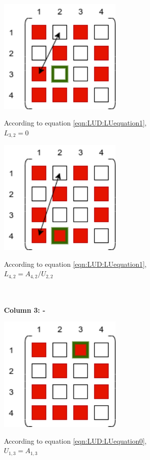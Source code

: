 \begin{minipage}{0.45\textwidth}
\includegraphics[width=0.45\textwidth]{./Scheduler/PpT-Symbolic_A12.png}
\end{minipage}%
\hfill
\begin{minipage}{0.85\textwidth}
According to equation \ref{eqn:LUD:LUequation1},\\
$L_{3,2}=0$
\end{minipage}

\begin{minipage}{0.45\textwidth}
\includegraphics[width=0.45\textwidth]{./Scheduler/PpT-Symbolic_A13.png}
\end{minipage}%
\hfill
\begin{minipage}{0.85\textwidth}
According to equation \ref{eqn:LUD:LUequation1},\\
$L_{4,2}=A_{4,2}/U_{2,2}$
\end{minipage}
\\\\
\textbf{Column 3: -}

\begin{minipage}{0.45\textwidth}
\includegraphics[width=0.45\textwidth]{./Scheduler/PpT-Symbolic_A20.png}
\end{minipage}%
\hfill
\begin{minipage}{0.85\textwidth}
According to equation \ref{eqn:LUD:LUequation0},\\
$U_{1,3}=A_{1,3}$
\end{minipage}

